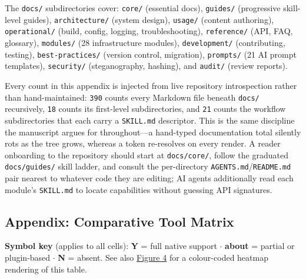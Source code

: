 \documentclass[
  english,
]{article}
\begin{document}
The \texttt{docs/} subdirectories cover: \texttt{core/} (essential
docs), \texttt{guides/} (progressive skill-level guides),
\texttt{architecture/} (system design), \texttt{usage/} (content
authoring), \texttt{operational/} (build, config, logging,
troubleshooting), \texttt{reference/} (API, FAQ, glossary),
\texttt{modules/} (28 infrastructure modules), \texttt{development/}
(contributing, testing), \texttt{best-practices/} (version control,
migration), \texttt{prompts/} (21 AI prompt templates),
\texttt{security/} (steganography, hashing), and \texttt{audit/} (review
reports).

Every count in this appendix is injected from live repository
introspection rather than hand-maintained: \texttt{390} counts every
Markdown file beneath \texttt{docs/} recursively, \texttt{18} counts its
first-level subdirectories, and \texttt{21} counts the workflow
subdirectories that each carry a \texttt{SKILL.md} descriptor. This is
the same discipline the manuscript argues for throughout---a hand-typed
documentation total silently rots as the tree grows, whereas a token
re-resolves on every render. A reader onboarding to the repository
should start at \texttt{docs/core/}, follow the graduated
\texttt{docs/guides/} skill ladder, and consult the per-directory
\texttt{AGENTS.md}/\texttt{README.md} pair nearest to whatever code they
are editing; AI agents additionally read each module's \texttt{SKILL.md}
to locate capabilities without guessing API signatures.

\newpage

\newpage

\subsection{Appendix: Comparative Tool Matrix}\label{appendix-matrix}

\textbf{Symbol key} (applies to all cells): \textbf{Y} = full native
support \texorpdfstring{\ensuremath{\cdot}}{.} \textbf{about } = partial or plugin-based \texorpdfstring{\ensuremath{\cdot}}{.}
\textbf{N} = absent. See also
\href{04_results.md\#comparative-feature-analysis}{Figure 4} for a
colour-coded heatmap rendering of this table.

\begin{table}[h]
\caption{Comparative feature matrix (14 capabilities $\times$ 10 tools). Y~=~full native support, about ~=~partial or plugin-based, N~=~absent.}
\label{tab:comparative-matrix}
\end{table}
\end{document}
